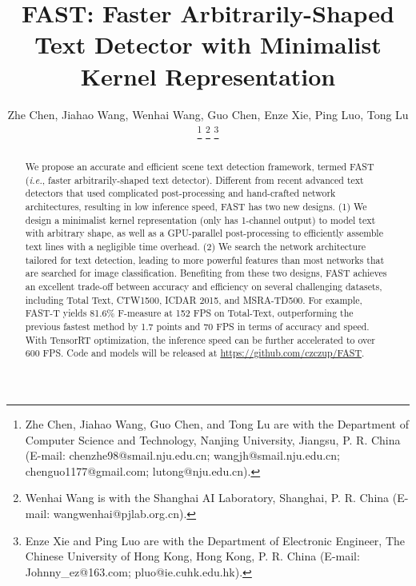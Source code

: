 \documentclass[lettersize,journal]{IEEEtran}
\begin{document}
\title{FAST: Faster Arbitrarily-Shaped Text Detector with Minimalist Kernel Representation}

\author{Zhe Chen, Jiahao Wang, Wenhai Wang, Guo Chen, Enze Xie, Ping Luo, Tong Lu
\thanks{
Zhe Chen, Jiahao Wang, Guo Chen, and Tong Lu are with the Department of Computer Science and Technology, Nanjing University, Jiangsu, P. R. China (E-mail: chenzhe98@smail.nju.edu.cn; wangjh@smail.nju.edu.cn; chenguo1177@gmail.com; lutong@nju.edu.cn).}
\thanks{
Wenhai Wang is with the Shanghai AI Laboratory, Shanghai, P. R. China (E-mail: wangwenhai@pjlab.org.cn).}
\thanks{
Enze Xie and Ping Luo are with the Department of Electronic Engineer, The Chinese University of Hong Kong, Hong Kong, P. R. China (E-mail: Johnny\_ez@163.com; pluo@ie.cuhk.edu.hk).}
}





\def\ie{\textit{i.e.}}
\def\eg{\textit{e.g.}}
\def\etc{etc}
\def\etal{\textit{et al.}}

\maketitle

\begin{abstract}
We propose an accurate and efficient scene text detection framework, termed FAST (\ie, faster arbitrarily-shaped text detector).
Different from recent advanced text detectors that used complicated post-processing and hand-crafted network architectures, resulting in low inference speed, FAST has two new designs.
(1) We design a minimalist kernel representation (only has 1-channel output) to model text with arbitrary shape, as well as a GPU-parallel post-processing to efficiently assemble text lines with a negligible time overhead.
(2) We search the network architecture 
tailored for text detection, leading to more powerful features than most networks that are searched for image classification.
Benefiting from these two designs, FAST achieves an excellent trade-off between accuracy and efficiency on several challenging datasets, including Total Text, CTW1500, ICDAR 2015, and MSRA-TD500.
For example, FAST-T yields 81.6\% F-measure at 152 FPS on Total-Text, outperforming the previous fastest method by 1.7 points and 70 FPS in terms of accuracy and speed.
With TensorRT optimization, the inference speed can be further accelerated to over 600 FPS.
Code and models will be released at \url{https://github.com/czczup/FAST}.
\end{abstract}
\end{document}
